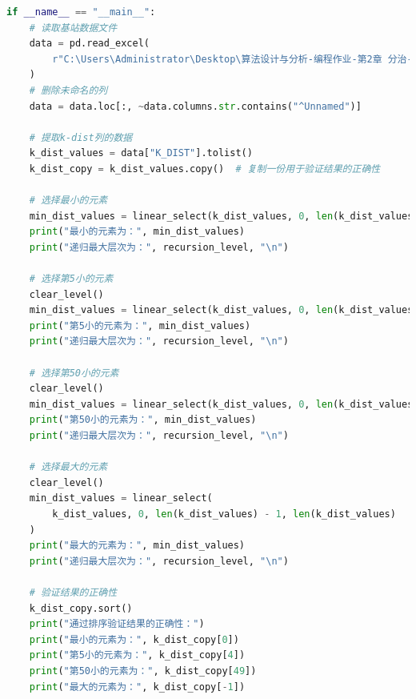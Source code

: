 \documentclass[lang=cn,11pt,a4paper]{elegantpaper}
\begin{document}
\begin{lstlisting}[language=python]
if __name__ == "__main__":
    # 读取基站数据文件
    data = pd.read_excel(
        r"C:\Users\Administrator\Desktop\算法设计与分析-编程作业-第2章 分治-2023\02-1 1033个基站数据.xls"
    )
    # 删除未命名的列
    data = data.loc[:, ~data.columns.str.contains("^Unnamed")]

    # 提取k-dist列的数据
    k_dist_values = data["K_DIST"].tolist()
    k_dist_copy = k_dist_values.copy()  # 复制一份用于验证结果的正确性

    # 选择最小的元素
    min_dist_values = linear_select(k_dist_values, 0, len(k_dist_values) - 1, 1)
    print("最小的元素为：", min_dist_values)
    print("递归最大层次为：", recursion_level, "\n")

    # 选择第5小的元素
    clear_level()
    min_dist_values = linear_select(k_dist_values, 0, len(k_dist_values) - 1, 5)
    print("第5小的元素为：", min_dist_values)
    print("递归最大层次为：", recursion_level, "\n")

    # 选择第50小的元素
    clear_level()
    min_dist_values = linear_select(k_dist_values, 0, len(k_dist_values) - 1, 50)
    print("第50小的元素为：", min_dist_values)
    print("递归最大层次为：", recursion_level, "\n")

    # 选择最大的元素
    clear_level()
    min_dist_values = linear_select(
        k_dist_values, 0, len(k_dist_values) - 1, len(k_dist_values)
    )
    print("最大的元素为：", min_dist_values)
    print("递归最大层次为：", recursion_level, "\n")

    # 验证结果的正确性
    k_dist_copy.sort()
    print("通过排序验证结果的正确性：")
    print("最小的元素为：", k_dist_copy[0])
    print("第5小的元素为：", k_dist_copy[4])
    print("第50小的元素为：", k_dist_copy[49])
    print("最大的元素为：", k_dist_copy[-1])

\end{lstlisting}
\end{document}
